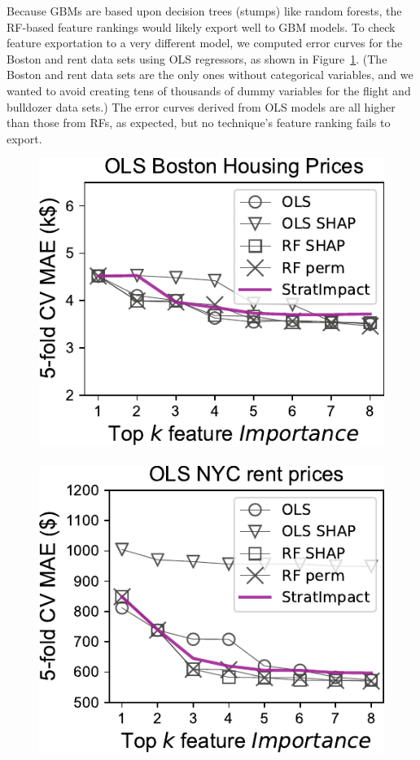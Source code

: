 \documentclass[11pt]{article}
\newcommand{\figref}[1]{Figure~\ref{#1}}
\begin{document}
Because GBMs are based upon decision trees (stumps) like random forests, the RF-based feature rankings would likely export well to GBM models.  To check feature exportation to a very different model, we computed error curves for the Boston and rent  data sets using OLS regressors, as shown in \figref{fig:OLS}. (The Boston and rent data sets are the only ones without categorical variables, and we wanted to avoid creating tens of thousands of dummy variables for the flight and bulldozer data sets.) The error curves derived from OLS models are all higher than those from RFs, as expected, but no technique's feature ranking fails to export.

\begin{figure}[htbp]
\begin{center}
\includegraphics[scale=0.5]{images/boston-topk-OLS-Importance.pdf}~~~
\includegraphics[scale=0.5]{images/rent-topk-OLS-Importance.pdf}
\label{fig:OLS}
\end{center}
\end{figure}
\end{document}

